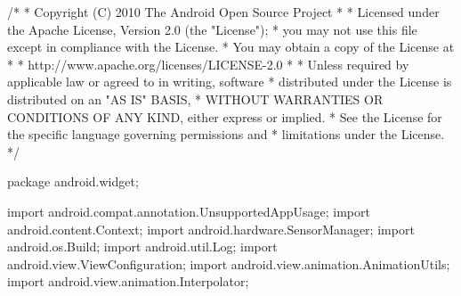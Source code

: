 /*
 * Copyright (C) 2010 The Android Open Source Project
 *
 * Licensed under the Apache License, Version 2.0 (the "License");
 * you may not use this file except in compliance with the License.
 * You may obtain a copy of the License at
 *
 *      http://www.apache.org/licenses/LICENSE-2.0
 *
 * Unless required by applicable law or agreed to in writing, software
 * distributed under the License is distributed on an "AS IS" BASIS,
 * WITHOUT WARRANTIES OR CONDITIONS OF ANY KIND, either express or implied.
 * See the License for the specific language governing permissions and
 * limitations under the License.
 */

package android.widget;

import android.compat.annotation.UnsupportedAppUsage;
import android.content.Context;
import android.hardware.SensorManager;
import android.os.Build;
import android.util.Log;
import android.view.ViewConfiguration;
import android.view.animation.AnimationUtils;
import android.view.animation.Interpolator;

